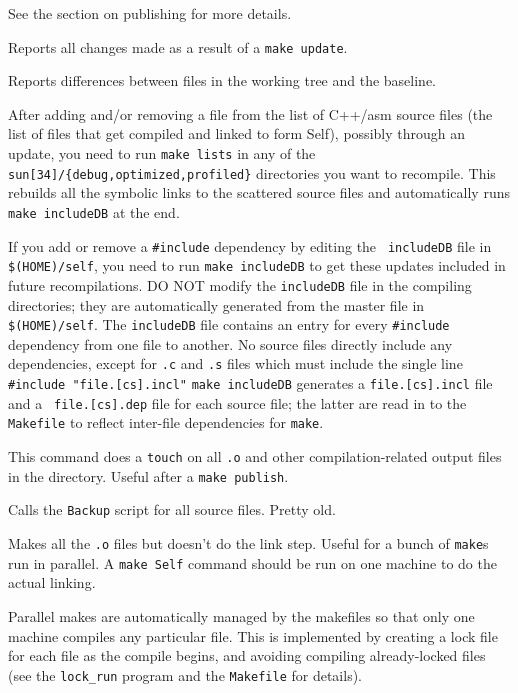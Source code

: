 \begin{description}
See the section on publishing for more details.

Reports all changes made as a result of a {\tt make update}.

Reports differences between files in the working tree and the baseline.

After adding and/or removing a file from the list of C++/asm source
files (the list of files that get compiled and linked to form Self),
possibly through an update, you need to run {\tt make lists} in any of
the {\tt sun[34]/\{debug,optimized,profiled\}} directories you want to
recompile.  This rebuilds all the symbolic links to the scattered
source files and automatically runs {\tt make includeDB} at the end.

If you add or remove a {\tt \#include} dependency by editing the {\tt
includeDB} file in {\tt \$(HOME)/self}, you need to run {\tt make
includeDB} to get these updates included in future recompilations.  DO
NOT modify the {\tt includeDB} file in the compiling directories; they
are automatically generated from the master file in {\tt
\$(HOME)/self}.  The {\tt includeDB} file contains an entry for every
{\tt \#include} dependency from one file to another.  No source files
directly include any dependencies, except for {\tt .c} and {\tt .s}
files which must include the single line
\bq
{\tt \#include "file.[cs].incl"}
\eq
{\tt make includeDB} generates a {\tt file.[cs].incl} file and a {\tt
file.[cs].dep} file for each source file; the latter are read in to
the {\tt Makefile} to reflect inter-file dependencies for {\tt make}.

This command does a {\tt touch} on all {\tt .o} and other
compilation-related output files in the directory.  Useful after a
{\tt make publish}.

Calls the {\tt Backup} script for all source files.  Pretty old.

Makes all the {\tt .o} files but doesn't do the link step.  Useful for
a bunch of {\tt make}s run in parallel.  A {\tt make Self} command
should be run on one machine to do the actual linking.

Parallel makes are automatically managed by the makefiles so that only
one machine compiles any particular file. This is implemented by
creating a lock file for each file as the compile begins, and avoiding
compiling already-locked files (see the {\tt lock\_run} program and
the {\tt Makefile} for details).


\end{description}
